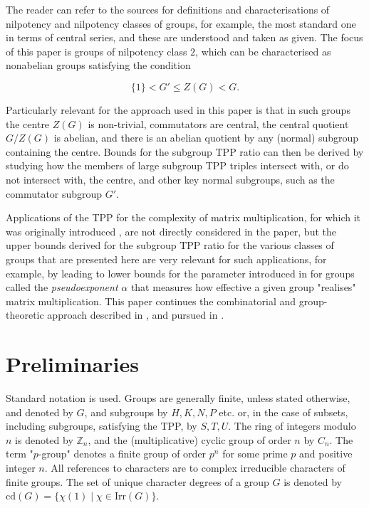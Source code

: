 \documentclass{amsart}
\theoremstyle{observation}
\theoremstyle{definition}
\theoremstyle{remark}
\numberwithin{equation}{section}
\begin{document}
\vspace{1mm}

The reader can refer to the sources for definitions and characterisations of nilpotency and nilpotency classes of groups, for example, the most standard one in terms of central series, and these are understood and taken as given. The focus of this paper is groups of nilpotency class $2$, which can be characterised as nonabelian groups satisfying the condition

\begin{equation}\label{NilpClassTwo}
\{1\} < G' \leq Z(G) < G.
\end{equation}

Particularly relevant for the approach used in this paper is that in such groups the centre $Z(G)$ is non-trivial, commutators are central, the central quotient $G/Z(G)$ is abelian, and there is an abelian quotient by any (normal) subgroup containing the centre. Bounds for the subgroup TPP ratio can then be derived by studying how the members of large subgroup TPP triples intersect with, or do not intersect with, the centre, and other key normal subgroups, such as the commutator subgroup $G'$.

\vspace{1mm}

Applications of the TPP for the complexity of matrix multiplication, for which it was originally introduced \citep{CU}, are not directly considered in the paper, but the upper bounds derived for the subgroup TPP ratio for the various classes of groups that are presented here are very relevant for such applications, for example, by leading to lower bounds for the parameter introduced in \cite[Definition 3.1, Lemma 3.1]{CU} for groups called the \emph{pseudoexponent} $\alpha$ that measures how effective a given group "realises" matrix multiplication. This paper continues the combinatorial and group-theoretic approach described in \citep{Neu2011}, and pursued in \citep{Mur}.

\section{Preliminaries}\label{Preliminaries}

Standard notation is used. Groups are generally finite, unless stated otherwise, and denoted by $G$, and subgroups by $H, K, N, P$ etc. or, in the case of subsets, including subgroups, satisfying the TPP, by $S, T, U$. The ring of integers modulo $n$ is denoted by $\mathbb{Z}_n$, and the (multiplicative) cyclic group of order $n$ by $C_n$. The term "$p$-group" denotes a finite group of order $p^n$ for some prime $p$ and positive integer $n$. All references to characters are to complex irreducible characters of finite groups. The set of unique character degrees of a group $G$ is denoted by $\text{cd}(G) = \{\chi(1) \mathrel | \chi \in \text{Irr}(G)\}$.
\end{document}

